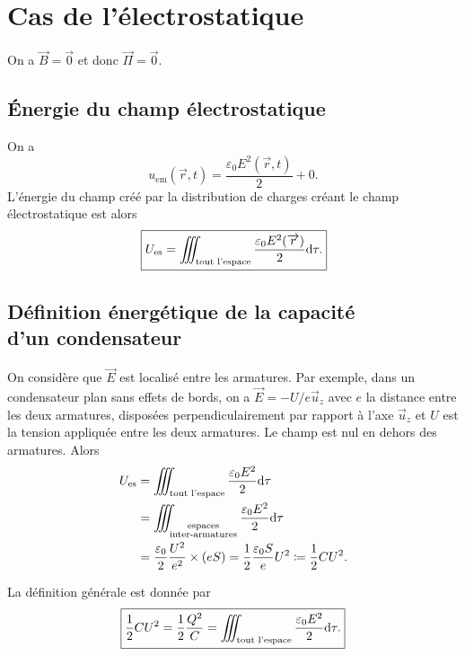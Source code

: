 \section{Cas de l'électrostatique}

On a $\vec{B}=\vec{0}$ et donc $\vec{\Pi}=\vec{0}$.

\subsection{Énergie du champ électrostatique}

On a 
\begin{equation*}
    \boxed{
        u_{\mathrm{em}}(\vec{r},t)=\frac{\varepsilon_0 E^{2}(\vec{r},t)}{2}+0.
    }
\end{equation*}
L'énergie du champ créé par la distribution de charges créant le champ électrostatique est alors 
\begin{equation*}
    \boxed{
        U_{\mathrm{es}}=\iiint_{\text{tout l'espace}}\frac{\varepsilon_0 E^{2}(\protect\overrightarrow{{r}})}{2}\mathrm{d}\tau.
    }
\end{equation*}

\subsection{Définition énergétique de la capacité\texorpdfstring{\\}{ }d'un condensateur}

On considère que $\vec{E}$ est localisé entre les armatures. Par exemple, dans un condensateur plan sans effets de bords, on a $\vec{E}=-U/e\vec{u}_z$ avec $e$ la distance entre les deux armatures, disposées perpendiculairement par rapport à l'axe $\vec{u}_z$ et $U$ est la tension appliquée entre les deux armatures. Le champ est nul en dehors des armatures. Alors
\begin{align*}
    U_{\mathrm{es}}
    &=
    \iiint_{\text{tout l'espace}}\frac{\varepsilon_0 E^{2}}{2}\mathrm{d}\tau\\
    &=
    \iiint_{\substack{\text{espaces}\\\text{inter-armatures}}}\frac{\varepsilon_0 E^{2}}{2}\mathrm{d}\tau\\
    &=
    \frac{\varepsilon_0}{2}\frac{U^{2}}{e^{2}}\times(e S)=\frac{1}{2}\frac{\varepsilon_0 S}{e}U^{2}\coloneqq\frac{1}{2}C U^{2}.
\end{align*}

La définition générale est donnée par
\begin{equation*}
    \boxed{
        \frac{1}{2}CU^{2}=\frac{1}{2}\frac{Q^{2}}{C}=\iiint_{\text{tout l'espace}}\frac{\varepsilon_0 E^{2}}{2}\mathrm{d}\tau.
    }
\end{equation*}